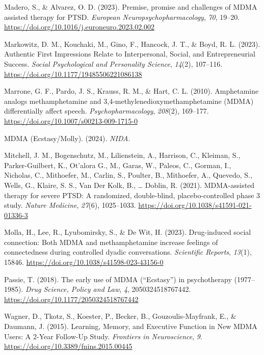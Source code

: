 \documentclass[
  man,
  longtable,
  nolmodern,
  notxfonts,
  notimes,
  colorlinks=true,linkcolor=blue,citecolor=blue,urlcolor=blue]{apa7}
\newlength{\cslhangindent}
\newenvironment{CSLReferences}[2] %
 {\begin{list}{}{%
  \setlength{\itemindent}{0pt}
  \setlength{\leftmargin}{0pt}
  \setlength{\parsep}{0pt}
  \ifodd #1
   \setlength{\leftmargin}{\cslhangindent}
   \setlength{\itemindent}{-1\cslhangindent}
  \fi
  \setlength{\itemsep}{#2\baselineskip}}}
 {\end{list}}
\begin{document}
\begin{CSLReferences}{1}{0}
Madero, S., \& Alvarez, O. D. (2023). Premise, promise and challenges of
{MDMA} assisted therapy for {PTSD}. \emph{European
Neuropsychopharmacology}, \emph{70}, 19--20.
\url{https://doi.org/10.1016/j.euroneuro.2023.02.002}

Markowitz, D. M., Kouchaki, M., Gino, F., Hancock, J. T., \& Boyd, R. L.
(2023). Authentic {First Impressions Relate} to {Interpersonal},
{Social}, and {Entrepreneurial Success}. \emph{Social Psychological and
Personality Science}, \emph{14}(2), 107--116.
\url{https://doi.org/10.1177/19485506221086138}

Marrone, G. F., Pardo, J. S., Krauss, R. M., \& Hart, C. L. (2010).
Amphetamine analogs methamphetamine and
3,4-methylenedioxymethamphetamine ({MDMA}) differentially affect speech.
\emph{Psychopharmacology}, \emph{208}(2), 169--177.
\url{https://doi.org/10.1007/s00213-009-1715-0}

{MDMA} ({Ecstasy}/{Molly}). (2024). \emph{NIDA}.

Mitchell, J. M., Bogenschutz, M., Lilienstein, A., Harrison, C.,
Kleiman, S., Parker-Guilbert, K., Ot'alora G., M., Garas, W., Paleos,
C., Gorman, I., Nicholas, C., Mithoefer, M., Carlin, S., Poulter, B.,
Mithoefer, A., Quevedo, S., Wells, G., Klaire, S. S., Van Der Kolk, B.,
\ldots{} Doblin, R. (2021). {MDMA-assisted} therapy for severe {PTSD}: A
randomized, double-blind, placebo-controlled phase 3 study. \emph{Nature
Medicine}, \emph{27}(6), 1025--1033.
\url{https://doi.org/10.1038/s41591-021-01336-3}

Molla, H., Lee, R., Lyubomirsky, S., \& De Wit, H. (2023). Drug-induced
social connection: Both {MDMA} and methamphetamine increase feelings of
connectedness during controlled dyadic conversations. \emph{Scientific
Reports}, \emph{13}(1), 15846.
\url{https://doi.org/10.1038/s41598-023-43156-0}

Passie, T. (2018). The early use of {MDMA} ({``{Ecstasy}''}) in
psychotherapy (1977--1985). \emph{Drug Science, Policy and Law},
\emph{4}, 2050324518767442.
\url{https://doi.org/10.1177/2050324518767442}

Wagner, D., Tkotz, S., Koester, P., Becker, B., Gouzoulis-Mayfrank, E.,
\& Daumann, J. (2015). Learning, {Memory}, and {Executive Function} in
{New MDMA Users}: {A} 2-{Year Follow-Up Study}. \emph{Frontiers in
Neuroscience}, \emph{9}. \url{https://doi.org/10.3389/fnins.2015.00445}

\end{CSLReferences}
\end{document}
